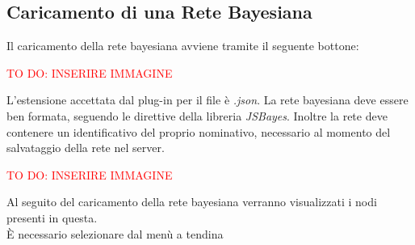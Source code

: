 \subsection{Caricamento di una Rete Bayesiana}\label{ReteB}

Il caricamento della rete bayesiana avviene tramite il seguente bottone: 

\textcolor{red}{TO DO: INSERIRE IMMAGINE} 

L'estensione accettata dal plug-in per il file è \textit{.json}. La rete bayesiana deve essere ben formata, seguendo le direttive della libreria \textit{JSBayes}. Inoltre la rete deve contenere un identificativo del proprio nominativo, necessario al momento del salvataggio della rete nel server.

\textcolor{red}{TO DO: INSERIRE IMMAGINE} 

Al seguito del caricamento della rete bayesiana verranno visualizzati i nodi presenti in questa. \\

È necessario selezionare dal menù a tendina 

